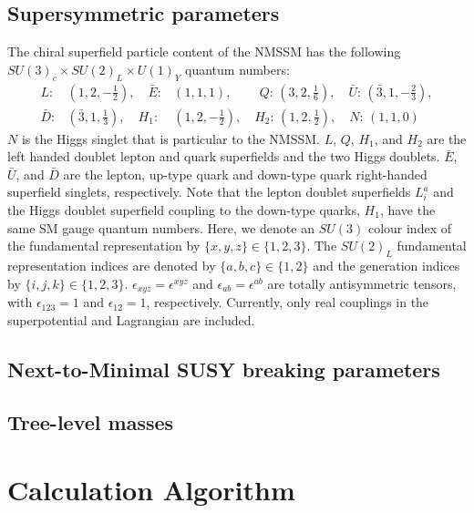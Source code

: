 \documentclass[final,3p,times,pdflatex]{elsarticle}
\begin{document}
\subsection{Supersymmetric parameters \label{susypars}}
The chiral superfield particle content of the NMSSM has the 
following $SU(3)_c\times SU(2)_L\times U(1)_Y$ quantum numbers:
\begin{eqnarray}
L:&(1,2,-\frac{1}{2}),\quad {\bar E}:&(1,1,1),\qquad\, Q:\,(3,2,\frac{1}{6}),\quad
{\bar U}:\,(\bar 3,1,-\frac{2}{3}),\nonumber\\ {\bar D}:&(\bar 3,1,\frac{1}{3}),\quad
H_1:&(1,2,-\frac{1}{2}),\quad  H_2:\,(1,2,\frac{1}{2}),\quad N:\,(1,1,0)
\label{fields}
\end{eqnarray}
$N$ is the Higgs singlet that is particular to the NMSSM.
$L$, $Q$, $H_1$, and $H_2$ are the left handed doublet lepton and
quark superfields and the two Higgs doublets. $\bar E$, $\bar U$, and
$\bar D$ are the lepton, up-type quark and down-type quark
right-handed superfield singlets, respectively. 
Note that the lepton
doublet superfields $L^a_i$ and the Higgs doublet superfield coupling
to the down-type quarks, $H_1$, have the same SM gauge 
quantum numbers. 
Here, we denote an $SU(3)$ colour index of the fundamental
representation by  $\{x,y,z\} \in \{1,2,3 \}$. The $SU(2)_L$ fundamental
representation indices are denoted by $\{a,b,c\} \in \{1,2\}$ and the generation
indices by $\{i,j,k\} \in \{1,2,3\}$. 
$\epsilon_{xyz}=\epsilon^{xyz}$ and  $\epsilon_{ab}=\epsilon^{ab}$ are totally
antisymmetric tensors, with $\epsilon_{123}=1$ and $\epsilon_{12}=1$,
respectively.  Currently, 
only real couplings in the superpotential and Lagrangian are included. 

\subsection{Next-to-Minimal SUSY breaking parameters \label{sec:susybreak}}


\subsection{Tree-level masses \label{sec:tree}}

\section{Calculation Algorithm \label{sec:calculation}}
\end{document}
